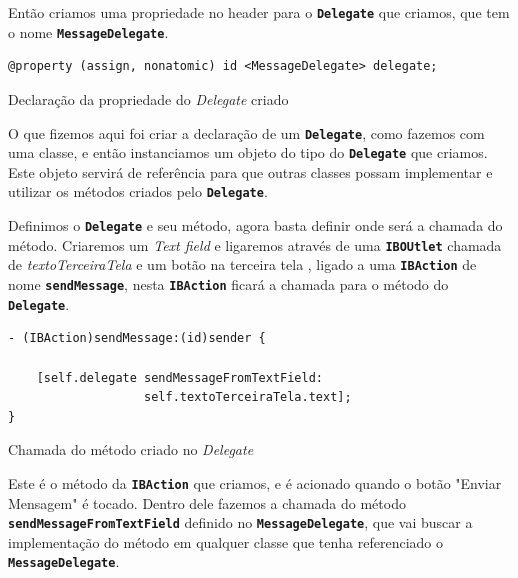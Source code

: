 \documentclass[a4paper,12pt,brazil,oneside]{book}
\begin{document}
Então criamos uma propriedade no header para o \texttt{\textbf{Delegate}} que criamos, que tem o nome \texttt{\textbf{MessageDelegate}}.

\begin{listing}[H]
\begin{verbatim}
@property (assign, nonatomic) id <MessageDelegate> delegate;
\end{verbatim}
\caption{Declaração da propriedade do \emph{Delegate} criado}
\end{listing}


O que fizemos aqui foi criar a declaração de um \texttt{\textbf{Delegate}}, como fazemos com uma classe, e então instanciamos um objeto do tipo do \texttt{\textbf{Delegate}} que criamos. Este objeto servirá de referência para que outras classes possam implementar e utilizar os métodos criados pelo \texttt{\textbf{Delegate}}.

Definimos o \texttt{\textbf{Delegate}} e seu método, agora basta definir onde será a chamada do método. Criaremos um \emph{Text field} e ligaremos através de uma \texttt{\textbf{IBOUtlet}} chamada de \emph{textoTerceiraTela} e um botão na terceira tela , ligado a uma \texttt{\textbf{IBAction}} de nome \texttt{\textbf{sendMessage}}, nesta \texttt{\textbf{IBAction}} ficará a chamada para o método do \texttt{\textbf{Delegate}}.

\begin{listing}
\begin{verbatim}
- (IBAction)sendMessage:(id)sender {
    
    [self.delegate sendMessageFromTextField:
                   self.textoTerceiraTela.text];
}
\end{verbatim}
\caption{Chamada do método criado no \emph{Delegate}}
\end{listing}

Este é o método da \texttt{\textbf{IBAction}} que criamos, e é acionado quando o botão "Enviar Mensagem" é tocado. Dentro dele fazemos a chamada do método \texttt{\textbf{sendMessageFromTextField}} definido no \texttt{\textbf{MessageDelegate}}, que vai buscar a implementação do método em qualquer classe que tenha referenciado o \texttt{\textbf{MessageDelegate}}.
\end{document}
